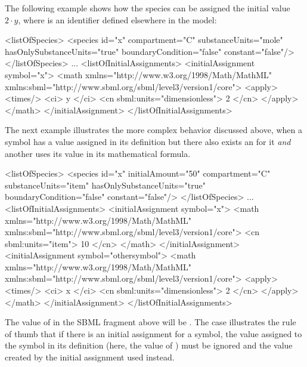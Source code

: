 The following example shows how the species  can be
assigned the initial value $2 \cdot y$, where  is an
identifier defined elsewhere in the model:

\begin{example}
<listOfSpecies>
    <species id="x" compartment="C" substanceUnits="mole"
             hasOnlySubstanceUnits="true" boundaryCondition="false" constant="false"/>
</listOfSpecies>
...
<listOfInitialAssignments>
    <initialAssignment symbol="x">
        <math xmlns="http://www.w3.org/1998/Math/MathML"
              xmlns:sbml="http://www.sbml.org/sbml/level3/version1/core">
            <apply>
                <times/> 
                <ci> y </ci> 
                <cn sbml:units="dimensionless"> 2 </cn>
            </apply>
        </math>
    </initialAssignment>
</listOfInitialAssignments>
\end{example}

The next example illustrates the more complex behavior discussed
above, when a symbol has a value assigned in its definition but
there also exists an \InitialAssignment for it \emph{and} another
\InitialAssignment uses its value in its mathematical formula.

\begin{example}
<listOfSpecies>
    <species id="x" initialAmount="50" compartment="C" substanceUnits="item"
             hasOnlySubstanceUnits="true" boundaryCondition="false" constant="false"/>
</listOfSpecies>
...
<listOfInitialAssignments>
    <initialAssignment symbol="x">
        <math xmlns="http://www.w3.org/1998/Math/MathML"
              xmlns:sbml="http://www.sbml.org/sbml/level3/version1/core">
            <cn sbml:units="item"> 10 </cn>
        </math>
    </initialAssignment>
    <initialAssignment symbol="othersymbol">
        <math xmlns="http://www.w3.org/1998/Math/MathML"
              xmlns:sbml="http://www.sbml.org/sbml/level3/version1/core">
            <apply>
                <times/>
                <ci> x </ci>
                <cn sbml:units="dimensionless"> 2 </cn>
            </apply>
        </math>
    </initialAssignment>
</listOfInitialAssignments>
\end{example}

The value of  in the SBML fragment above will be
.  The case illustrates the rule of thumb that if there is
an initial assignment for a symbol, the value assigned to the
symbol in its definition (here, the value of
) must be ignored and the value created by
the initial assignment used instead.


